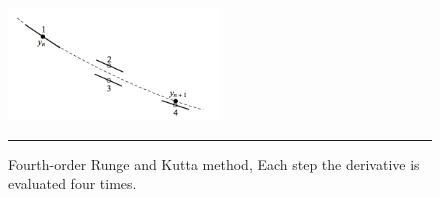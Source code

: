 \begin{figure}[htbp]
	\centering
		\includegraphics[width=0.5\textwidth]{Figures/rk4.png}
		\rule{35em}{0.5pt}
	\caption[Fourth-order Runge and Kutta Method]{Fourth-order Runge and Kutta method, Each step the derivative is evaluated four times. }
	\label{fig:kutta}
\end{figure}

\cite{numerical}

